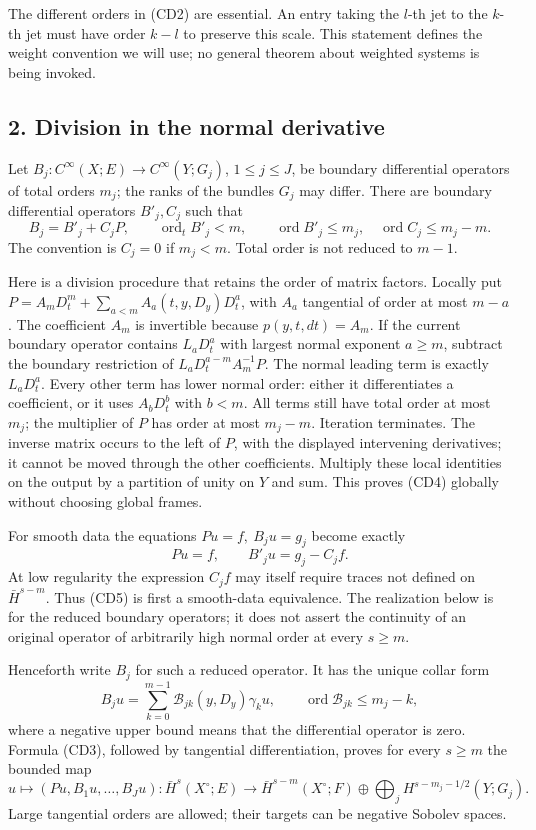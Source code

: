 \documentclass[
  11pt,
]{article}
\begin{document}
The different orders in (CD2) are essential. An entry taking the
\(l\)-th jet to the \(k\)-th jet must have order \(k-l\) to preserve
this scale. This statement defines the weight convention we will use; no
general theorem about weighted systems is being invoked.

\subsection{2. Division in the normal
derivative}\label{division-in-the-normal-derivative}

Let \(B_j:C^\infty(X;E)\to C^\infty(Y;G_j)\), \(1\leq j\leq J\), be
boundary differential operators of total orders \(m_j\); the ranks of
the bundles \(G_j\) may differ. There are boundary differential
operators \(B'_j,C_j\) such that \[
B_j=B'_j+C_jP,\qquad
\operatorname{ord}_t B'_j<m,\qquad
\operatorname{ord}B'_j\leq m_j,\quad
\operatorname{ord}C_j\leq m_j-m.
\tag{CD4}
\] The convention is \(C_j=0\) if \(m_j<m\). Total order is not reduced
to \(m-1\).

Here is a division procedure that retains the order of matrix factors.
Locally put \(P=A_mD_t^m+\sum_{a<m}A_a(t,y,D_y)D_t^a\), with \(A_a\)
tangential of order at most \(m-a\). The coefficient \(A_m\) is
invertible because \(p(y,t,dt)=A_m\). If the current boundary operator
contains \(L_aD_t^a\) with largest normal exponent \(a\geq m\), subtract
the boundary restriction of \(L_aD_t^{a-m}A_m^{-1}P\). The normal
leading term is exactly \(L_aD_t^a\). Every other term has lower normal
order: either it differentiates a coefficient, or it uses \(A_bD_t^b\)
with \(b<m\). All terms still have total order at most \(m_j\); the
multiplier of \(P\) has order at most \(m_j-m\). Iteration terminates.
The inverse matrix occurs to the left of \(P\), with the displayed
intervening derivatives; it cannot be moved through the other
coefficients. Multiply these local identities on the output by a
partition of unity on \(Y\) and sum. This proves (CD4) globally without
choosing global frames.

For smooth data the equations \(Pu=f,\ B_ju=g_j\) become exactly \[
Pu=f,\qquad B'_ju=g_j-C_jf.
\tag{CD5}
\] At low regularity the expression \(C_jf\) may itself require traces
not defined on \(\bar H^{s-m}\). Thus (CD5) is first a smooth-data
equivalence. The realization below is for the reduced boundary
operators; it does not assert the continuity of an original operator of
arbitrarily high normal order at every \(s\geq m\).

Henceforth write \(B_j\) for such a reduced operator. It has the unique
collar form \[
B_ju=\sum_{k=0}^{m-1}\mathcal B_{jk}(y,D_y)\gamma_ku,
\qquad \operatorname{ord}\mathcal B_{jk}\leq m_j-k,
\tag{CD6}
\] where a negative upper bound means that the differential operator is
zero. Formula (CD3), followed by tangential differentiation, proves for
every \(s\geq m\) the bounded map \[
u\longmapsto(Pu,B_1u,\ldots,B_Ju):
\bar H^s(X^\circ;E)\longrightarrow
\bar H^{s-m}(X^\circ;F)\oplus
\bigoplus_jH^{s-m_j-1/2}(Y;G_j).
\tag{CD7}
\] Large tangential orders are allowed; their targets can be negative
Sobolev spaces.
\end{document}
